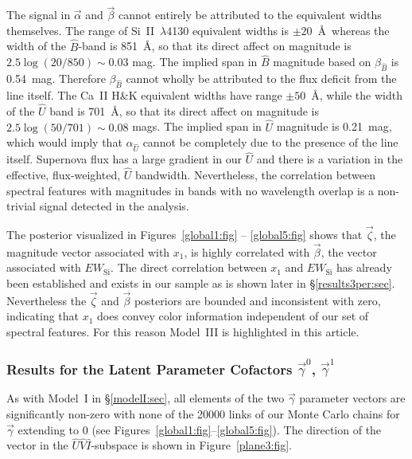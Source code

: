 \documentclass[trackchanges]{aastex62}   	%
\begin{document}
The signal in  $\vec{\alpha}$ and $\vec{\beta}$ cannot
entirely
be attributed to the equivalent widths themselves.
The range of Si~II~$\lambda$4130 equivalent widths is $\pm 20$~\AA\ whereas the width of the ${\hat{B}}$-band is 851~\AA, so that its direct affect on magnitude
is
$2.5 \log{(20/850)} \sim 0.03$ mag.  
The implied span in ${\hat{B}}$ magnitude based on $\beta_{\hat{B}}$ is 0.54~mag.  Therefore $\beta_{\hat{B}}$ cannot wholly be attributed to the flux deficit
from the line itself.
The Ca~II H\&K equivalent widths have range $\pm 50$~\AA, while the width of the ${\hat{U}}$ band is
701~\AA, so that its direct affect on magnitude
is
$2.5 \log{(50/701)} \sim 0.08$ mags.   The implied span in ${\hat{U}}$ magnitude is  0.21~mag, 
which would imply that  $\alpha_{\hat{U}}$ cannot be completely due to the 
presence of the line itself.  
Supernova flux has a large gradient in our $\hat{U}$ and there is a variation in the effective, flux-weighted,  $\hat{U}$ bandwidth. 
Nevertheless, the  correlation between spectral features with magnitudes in bands with no wavelength overlap is a non-trivial
signal detected in the analysis.

The posterior visualized in
Figures~\ref{global1:fig} -- \ref{global5:fig} shows
 that $\vec{\zeta}$, the magnitude vector associated with $x_1$, is highly correlated with $\vec{\beta}$, the vector
 associated with  $EW_{\mathrm{Si}}$.
The direct correlation between  $x_1$ and $EW_{\mathrm{Si}}$ has already been established
\citep{2008A&A...492..535A, 2011A&A...529L...4C}
and exists
in our sample as is shown later in \S\ref{results3per:sec}.  
Nevertheless the $\vec{\zeta}$ and $\vec{\beta}$   posteriors are bounded and inconsistent with zero, indicating that
 $x_1$ does convey color information independent of our set of spectral features.
For this reason  Model~III is highlighted in this article.

\subsubsection{Results for the Latent Parameter Cofactors $\vec{\gamma}^0$, $\vec{\gamma}^1$}
\label{results3gamma:sec}
As with Model~I in \S\ref{modelI:sec}, all elements of the two $\vec{\gamma}$ parameter vectors 
are significantly non-zero with 
none of the 20000 links of 
our Monte Carlo chains for $\vec{\gamma}$ extending to 0 (see Figures~\ref{global1:fig}--\ref{global5:fig}).
The direction of the vector in the ${\hat{U}}{\hat{V}}{\hat{I}}$-subspace is shown in Figure~\ref{plane3:fig}.
\end{document}
